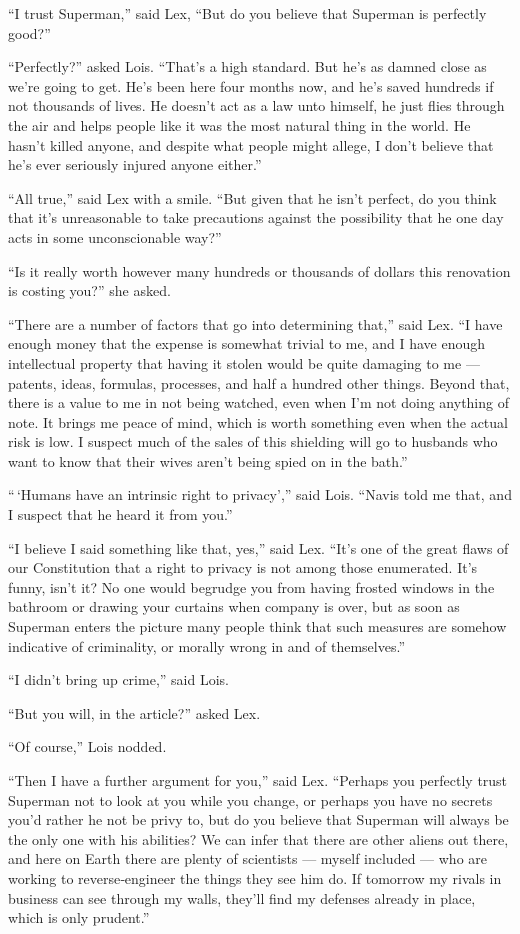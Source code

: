 ``I trust Superman,'' said Lex, ``But do you believe that Superman is
perfectly good?''

``Perfectly?'' asked Lois. ``That's a high standard. But he's as damned
close as we're going to get. He's been here four months now, and he's
saved hundreds if not thousands of lives. He doesn't act as a law unto
himself, he just flies through the air and helps people like it was the
most natural thing in the world. He hasn't killed anyone, and despite
what people might allege, I don't believe that he's ever seriously
injured anyone either.''

``All true,'' said Lex with a smile. ``But given that he isn't perfect,
do you think that it's unreasonable to take precautions against the
possibility that he one day acts in some unconscionable way?''

``Is it really worth however many hundreds or thousands of dollars this
renovation is costing you?'' she asked.

``There are a number of factors that go into determining that,'' said
Lex. ``I have enough money that the expense is somewhat trivial to me,
and I have enough intellectual property that having it stolen would be
quite damaging to me --- patents, ideas, formulas, processes, and half a
hundred other things. Beyond that, there is a value to me in not being
watched, even when I'm not doing anything of note. It brings me peace of
mind, which is worth something even when the actual risk is low. I
suspect much of the sales of this shielding will go to husbands who want
to know that their wives aren't being spied on in the bath.''

``\,`Humans have an intrinsic right to privacy','' said Lois. ``Navis
told me that, and I suspect that he heard it from you.''

``I believe I said something like that, yes,'' said Lex. ``It's one of
the great flaws of our Constitution that a right to privacy is not among
those enumerated. It's funny, isn't it? No one would begrudge you from
having frosted windows in the bathroom or drawing your curtains when
company is over, but as soon as Superman enters the picture many people
think that such measures are somehow indicative of criminality, or
morally wrong in and of themselves.''

``I didn't bring up crime,'' said Lois.

``But you will, in the article?'' asked Lex.

``Of course,'' Lois nodded.

``Then I have a further argument for you,'' said Lex. ``Perhaps you
perfectly trust Superman not to look at you while you change, or perhaps
you have no secrets you'd rather he not be privy to, but do you believe
that Superman will always be the only one with his abilities? We can
infer that there are other aliens out there, and here on Earth there are
plenty of scientists --- myself included --- who are working to
reverse‐engineer the things they see him do. If tomorrow my rivals in
business can see through my walls, they'll find my defenses already in
place, which is only prudent.''

